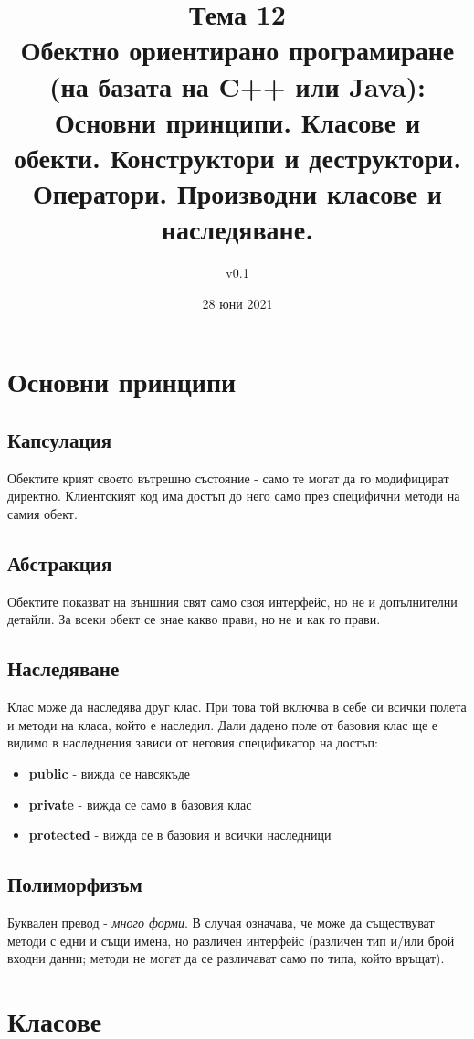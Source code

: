 \documentclass[fleqn,12pt]{article}
\title{Тема 12\\Обектно ориентирано програмиране (на базата на C++ или Java): Основни
принципи. Класове и обекти. Конструктори и деструктори. Оператори.
Производни класове и наследяване.}
\author{v0.1}
\date{28 юни 2021}
\begin{document}
\maketitle

\tableofcontents

\section{Основни принципи}
\subsection{Капсулация}
Обектите крият своето вътрешно състояние - само те могат да го модифицират директно. 
Клиентският код има достъп до него само през специфични методи на самия обект.

\subsection{Абстракция}
Обектите показват на външния свят само своя интерфейс, но не и допълнителни детайли. 
За всеки обект се знае какво прави, но не и как го прави.

\subsection{Наследяване}
Клас може да наследява друг клас. При това той включва в себе си всички полета и методи на класа, който е наследил.
Дали дадено поле от базовия клас ще е видимо в наследнения зависи от неговия спецификатор на достъп:
\begin{itemize}
    \item \textbf{public} - вижда се навсякъде
    \item \textbf{private} - вижда се само в базовия клас
    \item \textbf{protected} - вижда се в базовия и всички наследници
\end{itemize}

\subsection{Полиморфизъм}
Буквален превод - \textit{много форми}. В случая означава, че може да съществуват методи с едни и същи имена, но различен интерфейс (различен тип и/или брой входни данни; методи не могат да се различават само по типа, който връщат).

\section{Класове}
\end{document}
